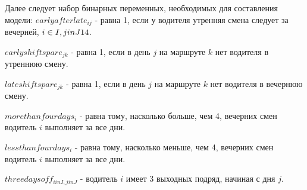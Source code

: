 \documentclass[]{article}
\begin{document}
Далее следует набор бинарных переменных, необходимых для составления модели:
$earlyafterlate_{ij}$ - равна 1, если у водителя утренняя смена следует за вечерней,
$i \in I, j in J\\{14}$.
\par\noindent
$earlyshiftspare_{jk}$ - равна 1, если в день $j$ на маршруте $k$ нет водителя в утреннюю смену.
\par\noindent
$lateshiftspare_{jk}$ - равна 1, если в день $j$ на маршруте $k$ нет водителя в вечернюю смену.
\par\noindent
$morethanfourdays_{i}$ - равна тому, насколько больше, чем 4,  вечерних смен водитель $i$ выполняет за все дни.
\par\noindent
$lessthanfourdays_{i}$ - равна тому, насколько меньше, чем 4,  вечерних смен водитель $i$ выполняет за все дни.
\par\noindent
$threedaysoff_{i in I, j in J}$ - водитель $i$ имеет 3 выходных подряд, начиная с дня $j$.
\par\noindent
\end{document}
